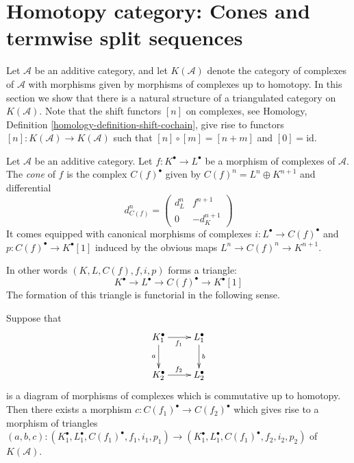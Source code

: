 \section{Homotopy category: Cones and termwise split sequences}
\label{section-cones}

\noindent
Let $\mathcal{A}$ be an additive category, and let
$K(\mathcal{A})$ denote the category of complexes of
$\mathcal{A}$ with morphisms given by morphisms of
complexes up to homotopy. In this section we show that
there is a natural structure of a triangulated category on
$K(\mathcal{A})$. Note that the shift functors
$[n]$ on complexes, see
Homology, Definition \ref{homology-definition-shift-cochain},
give rise to functors $[n] : K(\mathcal{A}) \to K(\mathcal{A})$
such that $[n] \circ [m] = [n + m]$ and $[0] = \text{id}$.

\begin{definition}
\label{definition-cone}
Let $\mathcal{A}$ be an additive category.
Let $f : K^\bullet \to L^\bullet$ be a morphism of
complexes of $\mathcal{A}$. The {\it cone} of $f$
is the complex $C(f)^\bullet$ given by
$C(f)^n = L^n \oplus K^{n + 1}$ and
differential
$$
d_{C(f)}^n =
\left(
\begin{matrix}
d^n_L & f^{n + 1} \\
0 & -d_K^{n + 1}
\end{matrix}
\right)
$$
It comes equipped with canonical morphisms of complexes
$i : L^\bullet \to C(f)^\bullet$ and $p : C(f)^\bullet \to K^\bullet[1]$
induced by the obvious maps $L^n \to C(f)^n \to K^{n + 1}$.
\end{definition}

\noindent
In other words $(K, L, C(f), f, i, p)$ forms a triangle:
$$
K^\bullet \to L^\bullet \to C(f)^\bullet \to K^\bullet[1]
$$
The formation of this triangle is
functorial in the following sense.

\begin{lemma}
\label{lemma-functorial-cone}
Suppose that
$$
\xymatrix{
K_1^\bullet \ar[r]_{f_1} \ar[d]_a & L_1^\bullet \ar[d]^b \\
K_2^\bullet \ar[r]^{f_2} & L_2^\bullet
}
$$
is a diagram of morphisms of complexes which is commutative
up to homotopy. Then there exists a morphism
$c : C(f_1)^\bullet \to C(f_2)^\bullet$ which gives rise to
a morphism of triangles
$(a, b, c) : (K_1^\bullet, L_1^\bullet, C(f_1)^\bullet, f_1, i_1, p_1)
\to
(K_1^\bullet, L_1^\bullet, C(f_1)^\bullet, f_2, i_2, p_2)$
of $K(\mathcal{A})$.
\end{lemma}

